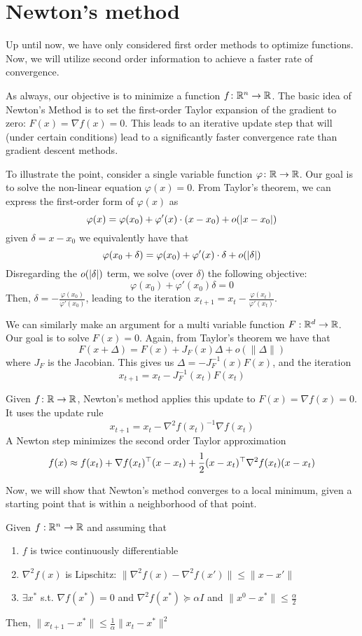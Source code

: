 \section{Newton's method}
Up until now, we have only considered first order  methods to optimize functions. Now, we will utilize second order information to achieve a faster rate of convergence.

As always, our objective is to minimize a function $f\colon \mathbb{R}^n \rightarrow \mathbb{R}$. The basic idea of Newton's Method is to set the first-order Taylor expansion of the gradient to zero: $F(x) = \nabla f(x) = 0$. This leads to an iterative update step that will (under certain conditions) lead to a significantly faster convergence rate than gradient descent methods.

To illustrate the point, consider a single variable function $\varphi\colon\mathbb{R} \rightarrow \mathbb{R}$. Our goal is to solve the non-linear equation $\varphi(x) = 0$. From Taylor's theorem, we can express the first-order form of $\varphi(x)$ as
$$\varphi(x) = \varphi(x_0) + \varphi'(x) \cdot (x-x_0) + o(\lvert x-x_0\rvert)$$
given $\delta = x - x_0$ we equivalently have that
$$\varphi(x_0 + \delta) = \varphi(x_0) + \varphi'(x) \cdot \delta + o(\lvert\delta\rvert)$$
Disregarding the $o(\lvert\delta\rvert)$ term, we solve (over $\delta$) the following objective: $$\varphi(x_0) + \varphi'(x_0) \delta = 0$$
Then, $\delta = -\frac{\varphi(x_0)}{\varphi'(x_0)}$, leading to the iteration 
$x_{t+1} = x_t - \frac{\varphi(x_t)}{\varphi'(x_t)}$.

We can similarly make an argument for a multi variable function $F: \mathbb{R}^d \rightarrow \mathbb{R}$. Our goal is to solve $F(x) = 0$. Again, from Taylor's theorem we have that
$$F(x + \Delta) = F(x) +  J_F(x) \Delta + o(\| \Delta\|)$$
where $J_F$ is the Jacobian. This gives us
$\Delta = -J_F^{-1}(x)F(x)$, and the iteration
$$x_{t+1} = x_t - J_F^{-1}(x_t)F(x_t)$$

Given $f\colon \mathbb{R} \rightarrow \mathbb{R}$, Newton's method applies this update to $F(x) = \nabla f(x) = 0$. It uses the update rule
$$x_{t+1} = x_t - \nabla^2 f(x_t)^{-1} \nabla f(x_t)$$
A Newton step minimizes the second order Taylor approximation
$$f(x) \approx f(x_t) + \nabla f(x_t) ^\top (x - x_t) + \frac{1}{2} (x - x_t) ^\top \nabla^2 f(x_t) (x - x_t)$$

Now, we will show that Newton's method converges to a local minimum, 
given a starting point that is within a neighborhood of that point.
\begin{theorem}
Given $f: \mathbb{R}^n \rightarrow \mathbb{R}$ and assuming that
\begin{enumerate}
\item $f$ is twice continuously differentiable
\item $\nabla^2 f(x)$ is Lipschitz: $\| \nabla^2 f(x) - \nabla^2 f(x') \| \leq \|x-x'\|$
\item $\exists x^*$ s.t. $\nabla f(x^*) = 0$ and $\nabla^2 f(x^*) \succeq \alpha I$ and $\|x^0 - x^*\| \leq \frac{\alpha}{2}$
\end{enumerate}
Then, $\|x_{t+1} - x^*\| \leq \frac{1}{\alpha} \|x_t - x^*\|^2$
\end{theorem}

